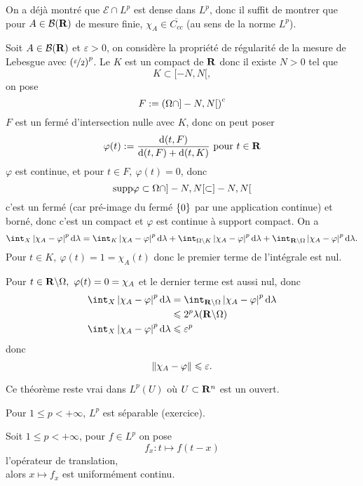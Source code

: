 \documentclass[a4paper,11pt, twoside]{article}
\begin{document}
\begin{Proof}
  On a déjà montré que $\mathcal E\cap L^p$ est dense dans $L^p$, donc il suffit de montrer que pour $A\in \mathcal B(\mathbf R)$ de mesure finie, $\chi_A\in\overline{C_{cc}}$ (au sens de la norme $L^p$).

  Soit $A\in \mathcal B(\mathbf R)$ et $\varepsilon>0$, on considère la propriété de régularité de la mesure de Lebesgue avec $\left(\displaystyle\nicefrac{\varepsilon}{2}\right)^p$. Le $K$ est un compact de $\mathbf R$ donc il existe $N>0$ tel que 
  $$K\subset [-N,N[,$$
  on pose 
  $$F:=\left(\Omega\cap]-N,N[\right)^c$$
  $F$ est un fermé d'intersection nulle avec $K$, donc on peut poser 
  $$\varphi (t):=\frac{\mathrm d(t,F)}{\mathrm d(t,F)+\mathrm d(t,K)}\text{ pour }t\in \mathbf R$$
  $\varphi$ est continue, et pour $t\in F,\ \varphi(t)=0$, donc 
  $$\mathrm{supp}\varphi\subset \Omega\cap ]-N,N[\subset ]-N,N[$$
  c'est un fermé (car pré-image du fermé $\left\{0\right\}$ par une application continue) et borné, donc c'est un compact et $\varphi$ est continue à support compact.
  On a 
  $$\int_X\abs{\chi_A-\varphi}^p\mathrm d\lambda=\int_K\abs{\chi_A-\varphi}^p\mathrm d\lambda+\int_{\O\backslash K}\abs{\chi_A-\varphi}^p\mathrm d\lambda+\int_{\R\backslash \O}\abs{\chi_A-\varphi}^p\mathrm d\lambda.$$ 
  Pour $t\in K,\ \varphi(t)=1=\chi_A(t)$ donc le premier terme de l'intégrale est nul.

  Pour $t\in \R\backslash\O,\ \varphi(t)=0=\chi_A$ et le dernier terme est aussi nul, donc 
  \begin{align*}
    \int_X\abs{\chi_A-\varphi}^p\mathrm d\lambda&=\int_{\R\backslash \O}\abs{\chi_A-\varphi}^p\mathrm d\lambda\\
    &\leqslant 2^p\lambda(\R\backslash\O)\\
    \int_X\abs{\chi_A-\varphi}^p\mathrm d\lambda&\leqslant \varepsilon^p
  \end{align*}
  donc 
  $$\left\lVert\chi_A-\varphi\right\rVert\leqslant \varepsilon.$$
\end{Proof}


\begin{RQ}
  Ce théorème reste vrai dans $L^p(U)$ où $U\subset\mathbf R^n$ est un ouvert.
\end{RQ}


\begin{RQ}
  Pour $1\leqslant p<+\infty$, $L^p$ est séparable (exercice).
\end{RQ}


\begin{Th}
  Soit $1\leqslant p<+\infty$, pour $f\in L^p$ on pose 
  $$f_x:t\longmapsto f(t-x)$$
  l'opérateur de translation,\\

  alors $x\longmapsto f_x$ est uniformément continu.
\end{Th}
\end{document}

